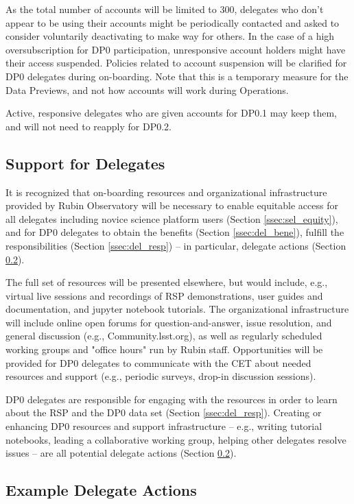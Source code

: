 \documentclass[DM,lsstdraft,authoryear,toc]{lsstdoc}
\begin{document}
As the total number of accounts will be limited to 300, delegates who don't appear to be using their accounts might be periodically contacted and asked to consider voluntarily deactivating to make way for others.
In the case of a high oversubscription for DP0 participation, unresponsive account holders might have their access suspended.
Policies related to account suspension will be clarified for DP0 delegates during on-boarding.
Note that this is a temporary measure for the Data Previews, and not how accounts will work during Operations.

Active, responsive delegates who are given accounts for DP0.1 may keep them, and will not need to reapply for DP0.2.

\subsection{Support for Delegates}\label{ssec:res_sup}

It is recognized that on-boarding resources and organizational infrastructure provided by Rubin Observatory will be necessary to enable equitable access for all delegates including novice science platform users (Section \ref{ssec:sel_equity}), and for DP0 delegates to obtain the benefits (Section \ref{ssec:del_bene}), fulfill the responsibilities (Section \ref{ssec:del_resp}) -- in particular, delegate actions (Section \ref{ssec:res_act}). 

The full set of resources will be presented elsewhere, but would include, e.g., virtual live sessions and recordings of RSP demonstrations, user guides and documentation, and jupyter notebook tutorials.
The organizational infrastructure will include online open forums for question-and-answer, issue resolution, and general discussion (e.g., Community.lsst.org), as well as regularly scheduled working groups and "office hours" run by Rubin staff.
Opportunities will be provided for DP0 delegates to communicate with the CET about needed resources and support (e.g., periodic surveys, drop-in discussion sessions).

DP0 delegates are responsible for engaging with the resources in order to learn about the RSP and the DP0 data set (Section \ref{ssec:del_resp}).
Creating or enhancing DP0 resources and support infrastructure -- e.g., writing tutorial notebooks, leading a collaborative working group, helping other delegates resolve issues -- are all potential delegate actions (Section \ref{ssec:res_act}).

\subsection{Example Delegate Actions}\label{ssec:res_act}
\end{document}
